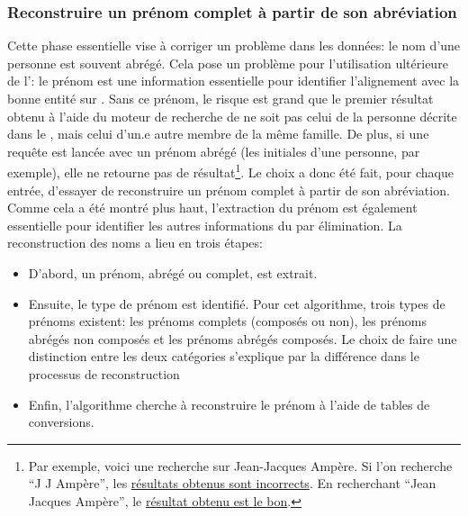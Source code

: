 \subsubsection{Reconstruire un prénom complet à partir de son abréviation}
Cette phase essentielle vise à corriger un problème dans les données: le nom d'une personne est souvent abrégé. Cela pose un problème pour l'utilisation ultérieure de l'\api{}: le prénom est une information essentielle pour identifier l'alignement avec la bonne entité sur \wkd{}. Sans ce prénom, le risque est grand que le premier résultat obtenu à l'aide du moteur de recherche de \wkd{} ne soit pas celui de la personne décrite dans le \tname{}, mais celui d'un.e autre membre de la même famille. De plus, si une requête est lancée avec un prénom abrégé (les initiales d'une personne, par exemple), elle ne retourne pas de résultat\footnote{Par exemple, voici une recherche sur Jean-Jacques Ampère. Si l'on recherche \enquote{J J Ampère}, les \href{https://www.wikidata.org/w/index.php?search=j+j+amp\%C3\%A8re}{résultats obtenus sont incorrects}. En recherchant \enquote{Jean Jacques Ampère}, le \href{https://www.wikidata.org/w/index.php?search=jean+jacques+amp\%C3\%A8re}{résultat obtenu est le bon}.}. Le choix a donc été fait, pour chaque entrée, d'essayer de reconstruire un prénom complet à partir de son abréviation. Comme cela a été montré plus haut, l'extraction du prénom est également essentielle pour identifier les autres informations du \tname{} par élimination. La reconstruction des noms a lieu en trois étapes: 
\begin{itemize}
	\item D'abord, un prénom, abrégé ou complet, est extrait.
	\item Ensuite, le type de prénom est identifié. Pour cet algorithme, trois types de prénoms existent: les prénoms complets (composés ou non), les prénoms abrégés non composés et les prénoms abrégés composés. Le choix de faire une distinction entre les deux catégories s'explique par la différence dans le processus de reconstruction
	\item Enfin, l'algorithme cherche à reconstruire le prénom à l'aide de tables de conversions.
\end{itemize}

